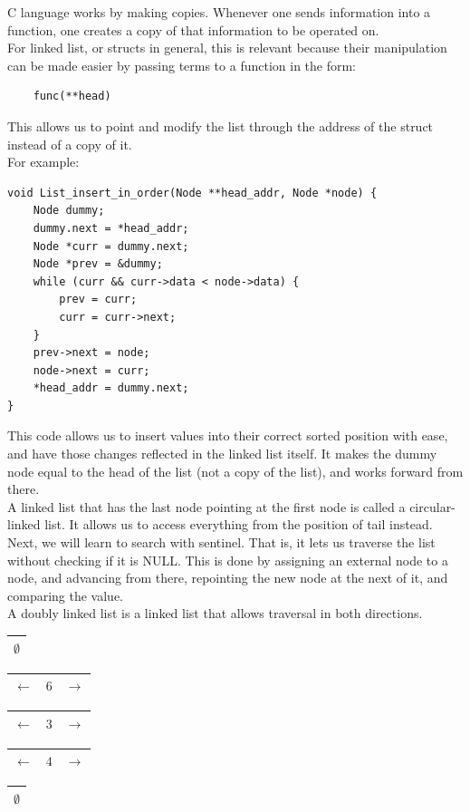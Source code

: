 \documentclass[nobib]{tufte-handout}
\begin{document}
C language works by making copies. Whenever one sends information into a function, one creates a copy of that information to be operated on.\\
For linked list, or structs in general, this is relevant because their manipulation can be made easier by passing terms to a function in the form:
\begin{lstlisting}
    func(**head)
\end{lstlisting}
This allows us to point and modify the list through the address of the struct
instead of a copy of it.\\ For example:
\begin{lstlisting}
void List_insert_in_order(Node **head_addr, Node *node) {
    Node dummy;
    dummy.next = *head_addr;
    Node *curr = dummy.next;
    Node *prev = &dummy;
    while (curr && curr->data < node->data) {
        prev = curr;
        curr = curr->next;
    }
    prev->next = node;
    node->next = curr;
    *head_addr = dummy.next;
}
\end{lstlisting}
This code allows us to insert values into their correct sorted position with
ease, and have those changes reflected in the linked list itself. It makes the
dummy node equal to the head of the list (not a copy of the list), and works
forward from there.\\ A linked list that has the last node pointing at the
first node is called a circular-linked list. It allows us to access everything
from the position of tail instead.\\ Next, we will learn to search with
sentinel. That is, it lets us traverse the list without checking if it is NULL.
This is done by assigning an external node to a node, and advancing from there,
repointing the new node at the next of it, and comparing the value.\\ A doubly
linked list is a linked list that allows traversal in both directions.\\
\begin{table}
    \centering
    \begin{tabular}{|c|}
        \hline
        $\emptyset$ \\
        \hline
    \end{tabular}
    \begin{tabular}{|c|c|c|}
        \hline
        $\leftarrow$ & $6$ & $\rightarrow$ \\
        \hline
    \end{tabular}
    \begin{tabular}{|c|c|c|}
        \hline
        $\leftarrow$ & $3$ & $\rightarrow$ \\
        \hline
    \end{tabular}
    \begin{tabular}{|c|c|c|}
        \hline
        $\leftarrow$ & $4$ & $\rightarrow$ \\
        \hline
    \end{tabular}
    \begin{tabular}{|c|}
        \hline
        $\emptyset$ \\
        \hline
    \end{tabular}
\end{table}
\end{document}
